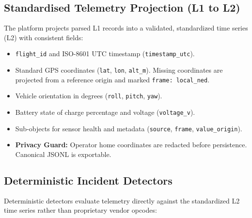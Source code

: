 \documentclass[11pt,a4paper]{article}
\newcommand{\code}[1]{\colorbox{codebg}{\small\texttt{\color{darkslate}#1}}}
\begin{document}
\subsection{Standardised Telemetry Projection (L1 to L2)}
The platform projects parsed L1 records into a validated, standardized time series (L2) with consistent fields:
\begin{itemize}
    \item \code{flight\_id} and ISO-8601 UTC timestamp (\code{timestamp\_utc}).
    \item Standard GPS coordinates (\code{lat}, \code{lon}, \code{alt\_m}). Missing coordinates are projected from a reference origin and marked \code{frame: local\_ned}.
    \item Vehicle orientation in degrees (\code{roll}, \code{pitch}, \code{yaw}).
    \item Battery state of charge percentage and voltage (\code{voltage\_v}).
    \item Sub-objects for sensor health and metadata (\code{source}, \code{frame}, \code{value\_origin}).
    \item \textbf{Privacy Guard:} Operator home coordinates are redacted before persistence. Canonical JSONL is exportable.
\end{itemize}

\subsection{Deterministic Incident Detectors}
Deterministic detectors evaluate telemetry directly against the standardized L2 time series rather than proprietary vendor opcodes:
\end{document}
